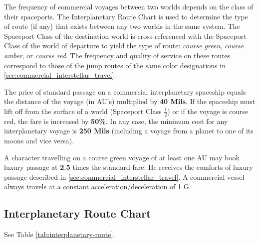 The frequency of commercial voyages between two worlds depends on the
class of their spaceports.  The Interplanetary Route Chart is used to
determine the type of route (if any) that exists between any two
worlds in the same system.  The Spaceport Class of the destination
world is cross-referenced with the Spaceport Class of the world of
departure to yield the type of route: \emph{course green},
\emph{course amber}, or \emph{course red}.  The frequency and quality
of service on these routes correspond to those of the jump routes of
the same color designations in
\ref{sec:commercial_interstellar_travel}.

The price of standard passage on a commercial interplanetary spaceship
equals the distance of the voyage (in AU's) multiplied by \textbf{40
  Mils}.  If the spaceship must lift off from the surface of a world
(Spaceport Class $\frac12$) or if the voyage is course red, the fare
is increased by \textbf{50\%}.  In any case, the minimum cost for any
interplanetary voyage is \textbf{250 Mils} (including a voyage from a
planet to one of its moons and vice versa).

A character travelling on a course green voyage of at least one AU may
book luxury passage at \textbf{2.5} times the standard fare.  He
receives the comforts of luxury passage described in
\ref{sec:commercial_interstellar_travel}.  A commercial vessel always
travels at a constant acceleration/deceleration of 1 G.


\subsection{Interplanetary Route Chart}
\label{sec:interplanetary-route-chart}

See Table \vref{tab:interplanetary-route}.

